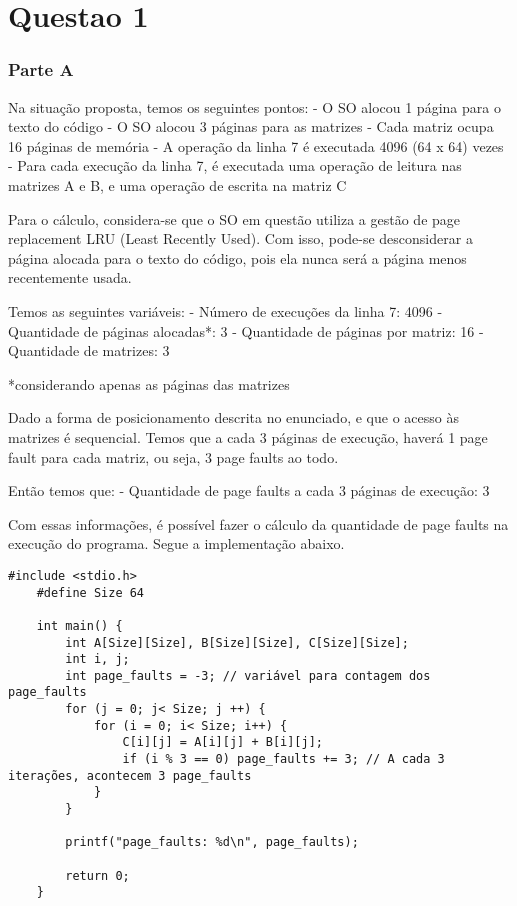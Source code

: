 \chapter{Questao 1}

\subsection*{Parte A}

Na situação proposta, temos os seguintes pontos:
- O SO alocou 1 página para o texto do código
- O SO alocou 3 páginas para as matrizes
- Cada matriz ocupa 16 páginas de memória
- A operação da linha 7 é executada 4096 (64 x 64) vezes
- Para cada execução da linha 7, é executada
 uma operação de leitura nas matrizes A e B,
 e uma operação de escrita na matriz C

Para o cálculo, considera-se que o SO em questão utiliza a
 gestão de page replacement LRU (Least Recently Used). Com isso,
 pode-se desconsiderar a página alocada para o texto do código,
 pois ela nunca será a página menos recentemente usada.

Temos as seguintes variáveis:
 - Número de execuções da linha 7: 4096
 - Quantidade de páginas alocadas*: 3
 - Quantidade de páginas por matriz: 16
 - Quantidade de matrizes: 3

*considerando apenas as páginas das matrizes

Dado a forma de posicionamento descrita no enunciado, e que o 
acesso às matrizes é sequencial. Temos que a cada 3 páginas de
 execução, haverá 1 page fault para cada matriz, ou seja, 3 page
 faults ao todo.

Então temos que:
 - Quantidade de page faults a cada 3 páginas de execução: 3


Com essas informações, é possível fazer o cálculo da quantidade de
 page faults na execução do programa. Segue a implementação abaixo.

 \begin{lstlisting}[style=CStyle]
    #include <stdio.h>
    #define Size 64
    
    int main() {
        int A[Size][Size], B[Size][Size], C[Size][Size];
        int i, j;
        int page_faults = -3; // variável para contagem dos page_faults
        for (j = 0; j< Size; j ++) {
            for (i = 0; i< Size; i++) {
                C[i][j] = A[i][j] + B[i][j];
                if (i % 3 == 0) page_faults += 3; // A cada 3 iterações, acontecem 3 page_faults
            }
        }
    
        printf("page_faults: %d\n", page_faults);
    
        return 0;
    }
 \end{lstlisting}
 
